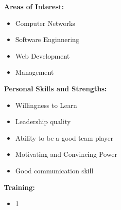\documentclass[paper = a4paper, 12pt]{article}
\begin{document}
\vspace{8mm}
{\Large \textbf{Areas of Interest:} \\
}
\begin{itemize}\addtolength{\leftskip}{8mm}	
	\item Computer Networks
	\item Software Enginnering
	\item Web Development
	\item Management
\end{itemize}

\vspace{8mm}
{\Large \textbf{Personal Skills and Strengths:}\\
}
\begin{itemize}\addtolength{\leftskip}{8mm}
	\item Willingness to Learn
	\item Leadership quality
	\item Ability to be a good team player
	\item Motivating and Convincing Power
	\item Good communication skill
\end{itemize}


\vspace{8mm}
{\Large \textbf{ Training:} \\
}
\begin{itemize}\addtolength{\leftskip}{8mm}
	\item 1
\end{itemize}
\end{document}
